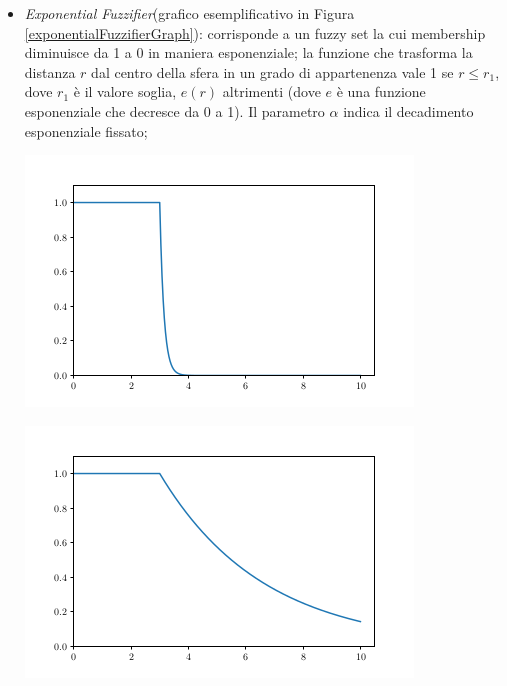\documentclass[12pt,a4paper]{report}
\begin{document}
\begin{itemize}
\item \emph{Exponential Fuzzifier}(grafico esemplificativo in Figura \ref{exponentialFuzzifierGraph}): corrisponde a un fuzzy set la cui  membership diminuisce da 1 a 0 in maniera esponenziale; la funzione che trasforma la distanza $r$ dal centro della sfera in un grado di appartenenza vale 1 se $r \leq r_1$, dove $r_1$ è il valore soglia, $e(r)$ altrimenti (dove $e$ è una funzione esponenziale che decresce da 0 a 1). Il parametro $\alpha$ indica il decadimento esponenziale fissato;

\begin{minipage}{\linewidth}
	\centering
       \includegraphics[width=0.8\linewidth]{images/exponentialFuzzifier.png}
	 \label{exponentialFuzzifierGraph}
\end{minipage}

\begin{minipage}{\linewidth}
	\centering
       \includegraphics[width=0.8\linewidth]{images/exponentialFuzzifier2.png}
\end{minipage}
\end{itemize}
\end{document}
